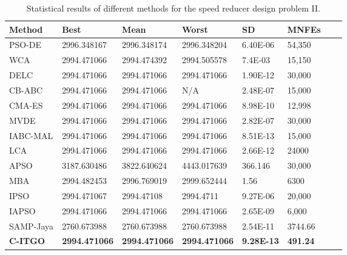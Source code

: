 
\begin{table*}[h]
    \tiny
    \begin{center}
    
    \begin{tabular}{ P{2.0cm} P{2.0cm} P{2.0cm} P{2.0cm} P{2.0cm} P{2.0cm} P{2.0cm} P{2.0cm}  }
    \hline
    \textbf{Method} & \textbf{Best} & \textbf{Mean} & \textbf{Worst} & \textbf{SD} & \textbf{MNFEs} \\
    \hline
    
    PSO-DE & 2996.348167 & 2996.348174 & 2996.348204 & 6.40E-06 & 54,350 \\
    WCA & 2994.471066 & 2994.474392 & 2994.505578 & 7.4E-03 & 15,150 \\    
    DELC & 2994.471066 & 2994.471066 & 2994.471066 & 1.90E-12 & 30,000 \\
    CB-ABC & 2994.471066 & 2994.471066 & N/A & 2.48E-07 & 15,000 \\
    CMA-ES & 2994.471066 & 2994.471066 & 2994.471066 & 8.98E-10 & 12,998 \\
    MVDE & 2994.471066 & 2994.471066 & 2994.471066 & 2.82E-07 & 30,000 \\    
    IABC-MAL & 2994.471066 & 2994.471066 & 2994.471066 & 8.51E-13 & 15,000 \\ 
    LCA & 2994.471066 & 2994.471066 & 2994.471066 & 2.66E-12 & 24000 \\
    APSO & 3187.630486 & 3822.640624 & 4443.017639 & 366.146 & 30,000 \\
    MBA & 2994.482453 & 2996.769019 & 2999.652444 & 1.56 & 6300 \\
    IPSO & 2994.471067 & 2994.47108 & 2994.4711 & 9.27E-06 & 20,000 \\
    IAPSO & 2994.471066 & 2994.471066 & 2994.471066 & 2.65E-09 & 6,000 \\
    SAMP-Jaya & 2760.673988 & 2760.673988 & 2760.673988 & 2.54E-11 & 3744.66 \\    
    \textbf{C-ITGO} & \bf{2994.471066} & \bf{2994.471066} & \bf{2994.471066} & \bf{9.28E-13} & \bf{491.24} \\ 
    
  

    \hline
    \end{tabular}
    \end{center}
    \vspace*{-6mm}
    \caption{Statistical results of different methods for the speed reducer design problem II. \\[1em]}
    \label{tab:SP2}
    \end{table*}
    
    